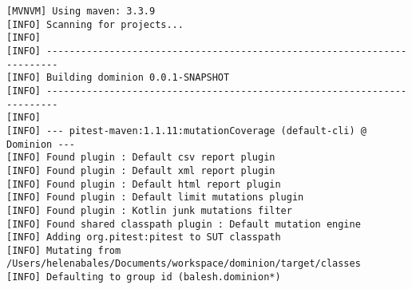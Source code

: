 \begin{lstlisting}
[MVNVM] Using maven: 3.3.9
[INFO] Scanning for projects...
[INFO]                                                                         
[INFO] ------------------------------------------------------------------------
[INFO] Building dominion 0.0.1-SNAPSHOT
[INFO] ------------------------------------------------------------------------
[INFO] 
[INFO] --- pitest-maven:1.1.11:mutationCoverage (default-cli) @ Dominion ---
[INFO] Found plugin : Default csv report plugin
[INFO] Found plugin : Default xml report plugin
[INFO] Found plugin : Default html report plugin
[INFO] Found plugin : Default limit mutations plugin
[INFO] Found plugin : Kotlin junk mutations filter
[INFO] Found shared classpath plugin : Default mutation engine
[INFO] Adding org.pitest:pitest to SUT classpath
[INFO] Mutating from /Users/helenabales/Documents/workspace/dominion/target/classes
[INFO] Defaulting to group id (balesh.dominion*)


\end{lstlisting}
